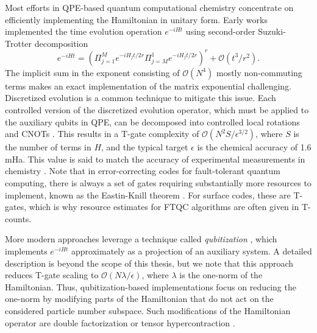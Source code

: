 \documentclass[../main.tex]{subfiles}
\begin{document}
Most efforts in QPE-based quantum computational chemistry concentrate on efficiently implementing the Hamiltonian in unitary form. Early works implemented the time evolution operation $e^{-iHt}$ using second-order Suzuki-Trotter decomposition \cite{reiher2016elucidating, berry2005efficient, suzuki1976relationship}
\begin{equation}
    e^{-iHt} = (\Pi^M_{j=1} e^{-i H_j t/2r} \Pi_{j=M}^1 e^{-i H_j t/2r})^r + \mathcal{O}(t^3/r^2).
\end{equation} The implicit sum in the exponent consisting of $\mathcal{O}(N^4)$ mostly non-commuting terms makes an exact implementation of the matrix exponential challenging. Discretized evolution is a common technique to mitigate this issue. Each controlled version of the discretized evolution operator, which must be applied to the auxiliary qubits in QPE, can be decomposed into controlled local rotations and CNOTs \cite{whitfield2010simulation}. This results in a T-gate complexity of $\mathcal{O}(N^2S/ \epsilon^{3/2})$, where $S$ is the number of terms in $H$, and the typical target $\epsilon$ is the chemical accuracy of 1.6 mHa. This value is said to match the accuracy of experimental measurements in chemistry \cite{pople1999nobel}. Note that in error-correcting codes for fault-tolerant quantum computing, there is always a set of gates requiring substantially more resources to implement, known as the Eastin-Knill theorem \cite{eastin2008restrictions}. For surface codes, these are T-gates, which is why resource estimates for FTQC algorithms are often given in T-counts.

More modern approaches leverage a technique called \textit{qubitization} \cite{low2019hamiltonian}, which implements $e^{-iHt}$ approximately as a projection of an auxiliary system. A detailed description is beyond the scope of this thesis, but we note that this approach reduces T-gate scaling to $\mathcal{O}(N \lambda / \epsilon)$, where $\lambda$ is the one-norm of the Hamiltonian. Thus, qubitization-based implementations focus on reducing the one-norm by modifying parts of the Hamiltonian that do not act on the considered particle number subspace. Such modifications of the Hamiltonian operator are double factorization \cite{von2020quantum} or tensor hypercontraction \cite{lee2020even}.
\end{document}
